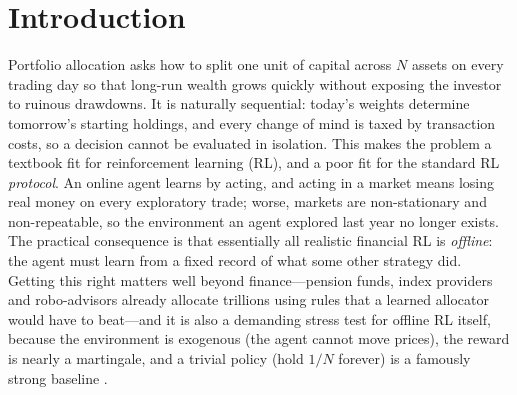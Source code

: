 \documentclass[11pt]{article}
\begin{document}
\section{Introduction}

Portfolio allocation asks how to split one unit of capital across $N$ assets on every trading
day so that long-run wealth grows quickly without exposing the investor to ruinous drawdowns.
It is naturally sequential: today's weights determine tomorrow's starting holdings, and every
change of mind is taxed by transaction costs, so a decision cannot be evaluated in isolation.
This makes the problem a textbook fit for reinforcement learning (RL), and a poor fit for the
standard RL \emph{protocol}. An online agent learns by acting, and acting in a market means
losing real money on every exploratory trade; worse, markets are non-stationary and
non-repeatable, so the environment an agent explored last year no longer exists. The
practical consequence is that essentially all realistic financial RL is \emph{offline}: the
agent must learn from a fixed record of what some other strategy did. Getting this right
matters well beyond finance---pension funds, index providers and robo-advisors already
allocate trillions using rules that a learned allocator would have to beat---and it is also a
demanding stress test for offline RL itself, because the environment is exogenous (the agent
cannot move prices), the reward is nearly a martingale, and a trivial policy (hold
$1/N$ forever) is a famously strong baseline \cite{demiguel2009optimal}.
\end{document}
